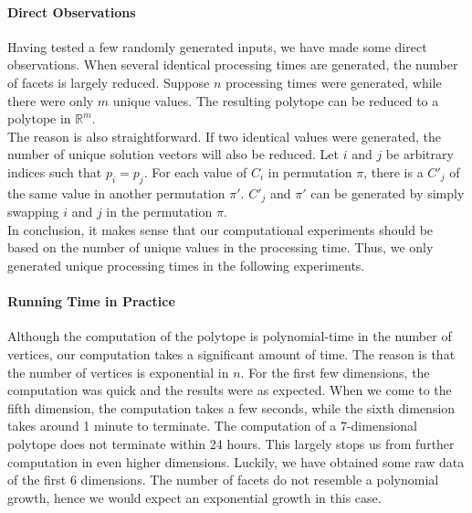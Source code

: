 \documentclass[12pt,letterpaper]{article}
\newcommand*{\R}{\mathbb{R}}
\begin{document}
\paragraph{Direct Observations}
Having tested a few randomly generated inputs, we have made some direct observations.
When several identical processing times are generated, the number of facets is largely reduced.
Suppose $n$ processing times were generated, while there were only $m$ unique values. 
The resulting polytope can be reduced to a polytope in $\R^m$.\\
The reason is also straightforward. If two identical values were generated, 
the number of unique solution vectors will also be reduced. Let $i$ and $j$ be 
arbitrary indices such that $p_i = p_j$. For each value of $C_i$ in permutation $\pi$, 
there is a $C'_j$ of the same value in another permutation $\pi'$. 
$C'_j$ and $\pi'$ can be generated by simply swapping $i$ and $j$ in the permutation $\pi$. \\
In conclusion, it makes sense that our computational experiments should be based 
on the number of unique values in the processing time. 
Thus, we only generated unique processing times in the following experiments. 

\paragraph{Running Time in Practice}
Although the computation of the polytope is polynomial-time in the number of vertices, our computation takes 
a significant amount of time. The reason is that the number of vertices is exponential in $n$. 
For the first few dimensions, the computation was quick and the results were as expected.
When we come to the fifth dimension, the computation takes a few seconds, while the sixth dimension 
takes around 1 minute to terminate. The computation of a 7-dimensional polytope does not terminate within 24 hours. 
This largely stops us from further computation in even higher dimensions. 
Luckily, we have obtained some raw data of the first 6 dimensions. 
The number of facets do not resemble a polynomial growth, hence we would expect an exponential growth in this case.

 
\end{document}
